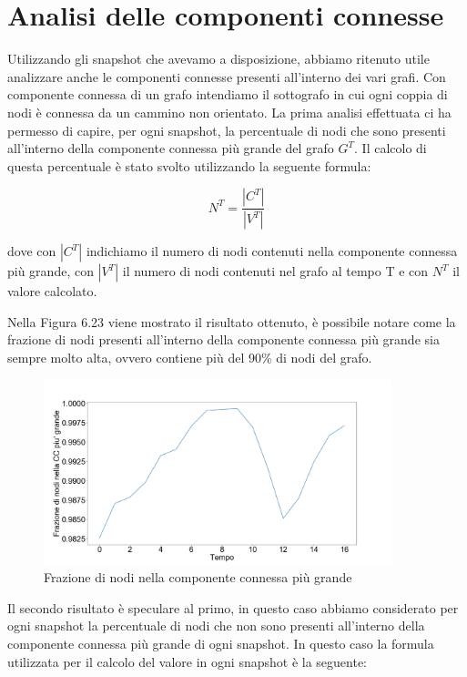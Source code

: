 \documentclass[12pt]{report}
\begin{document}
\newpage
\section{Analisi delle componenti connesse}



Utilizzando gli snapshot che avevamo a disposizione, abbiamo ritenuto utile analizzare anche le componenti connesse presenti all'interno dei vari grafi.
\newline
Con componente connessa di un grafo intendiamo il sottografo in cui ogni coppia di nodi è connessa da un cammino non orientato.
La prima analisi effettuata ci ha permesso di capire, per ogni snapshot, la percentuale di nodi che sono presenti all'interno della componente connessa più grande del grafo $G^T$.
\newline
Il calcolo di questa percentuale è stato svolto utilizzando la seguente formula:

\begin{equation}
    N^T = \frac{|C^T|}{|V^T|}
\end{equation}

dove con $|C^T|$ indichiamo il numero di nodi contenuti nella componente connessa più grande, con $|V^T|$ il numero di nodi contenuti nel grafo al tempo T e con $N^T$ il valore calcolato.

Nella Figura 6.23 viene mostrato il risultato ottenuto, è possibile notare come la frazione di nodi presenti all'interno della componente connessa più grande sia sempre molto alta, ovvero contiene più del 90\% di nodi del grafo.

\begin{figure}[H]
    \centering\includegraphics[width=0.9\textwidth]{GiantCC.png}
    \caption{Frazione di nodi nella componente connessa più grande}
\end{figure}

Il secondo risultato  è speculare al primo, in questo caso abbiamo considerato per ogni snapshot la percentuale di nodi che non sono presenti all'interno della componente connessa più grande di ogni snapshot.
\newline
In questo caso la formula utilizzata per il calcolo del valore in ogni snapshot è la seguente:
\end{document}
